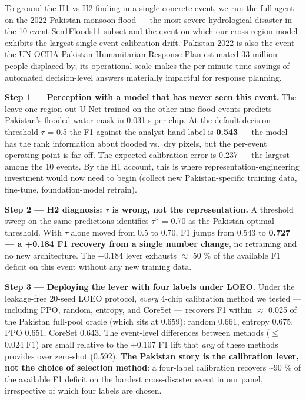 \documentclass[sn-nature,lineno]{sn-jnl}
\theoremstyle{thmstyleone}
\theoremstyle{thmstyletwo}
\theoremstyle{thmstylethree}
\begin{document}
To ground the H1-vs-H2 finding in a single concrete event, we run the
full agent on the 2022 Pakistan monsoon flood --- the most severe
hydrological disaster in the 10-event Sen1Floods11 subset and the event
on which our cross-region model exhibits the largest single-event
calibration drift. Pakistan 2022 is also the event the UN OCHA Pakistan
Humanitarian Response Plan estimated 33 million people displaced by;
its operational scale makes the per-minute time savings of automated
decision-level answers materially impactful for response planning.

\textbf{Step 1 --- Perception with a model that has never seen this event.}
The leave-one-region-out U-Net trained on the other nine flood events
predicts Pakistan's flooded-water mask in 0.031 s per chip. At the
default decision threshold $\tau$ = 0.5 the F1 against the analyst hand-label
is \textbf{0.543} --- the model has the rank information about flooded vs.~dry
pixels, but the per-event operating point is far off. The expected
calibration error is 0.237 --- the largest among the 10 events. By the H1
account, this is where representation-engineering investment would now
need to begin (collect new Pakistan-specific training data, fine-tune,
foundation-model retrain).

\textbf{Step 2 --- H2 diagnosis: $\tau$ is wrong, not the representation.} A
threshold sweep on the same predictions identifies $\tau$* = 0.70 as the
Pakistan-optimal threshold. With $\tau$ alone moved from 0.5 to 0.70, F1
jumps from 0.543 to \textbf{0.727 --- a +0.184 F1 recovery from a single number
change}, no retraining and no new architecture. The +0.184 lever
exhausts $\approx$ 50 \% of the available F1 deficit on this event without any
new training data.

\textbf{Step 3 --- Deploying the lever with four labels under LOEO.} Under the
leakage-free 20-seed LOEO protocol, \emph{every} 4-chip calibration method
we tested --- including PPO, random, entropy, and CoreSet --- recovers F1
within $\approx$ 0.025 of the Pakistan full-pool oracle (which sits at 0.659):
random 0.661, entropy 0.675, PPO 0.651, CoreSet 0.643. The
event-level differences between methods ($\leq$ 0.024 F1) are small relative
to the +0.107 F1 lift that \emph{any} of these methods provides over
zero-shot (0.592). \textbf{The Pakistan story is the calibration lever, not
the choice of selection method}: a four-label calibration recovers
\textasciitilde90 \% of the available F1 deficit on the hardest cross-disaster event
in our panel, irrespective of which four labels are chosen.
\end{document}
